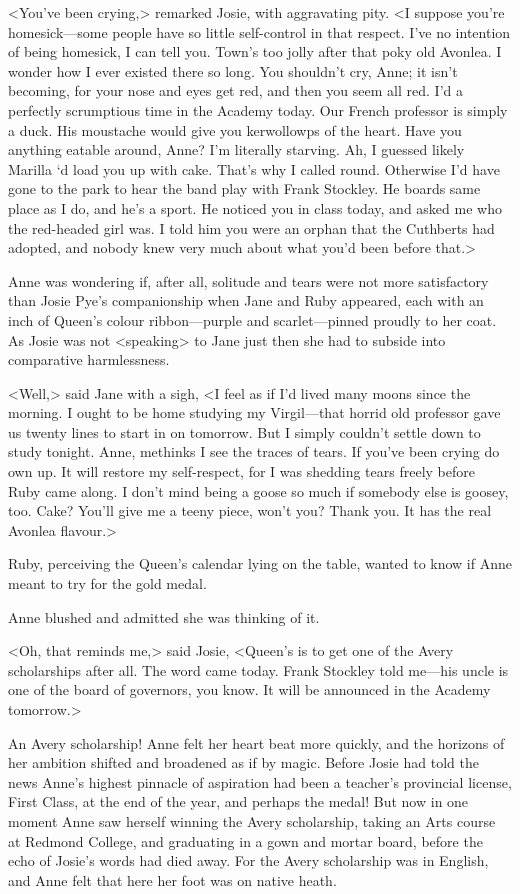 <You've been crying,> remarked Josie, with aggravating pity. <I suppose you're homesick—some people have so little self-control in that respect. I've no intention of being homesick, I can tell you. Town's too jolly after that poky old Avonlea. I wonder how I ever existed there so long. You shouldn't cry, Anne; it isn't becoming, for your nose and eyes get red, and then you seem all red. I'd a perfectly scrumptious time in the Academy today. Our French professor is simply a duck. His moustache would give you kerwollowps of the heart. Have you anything eatable around, Anne? I'm literally starving. Ah, I guessed likely Marilla `d load you up with cake. That's why I called round. Otherwise I'd have gone to the park to hear the band play with Frank Stockley. He boards same place as I do, and he's a sport. He noticed you in class today, and asked me who the red-headed girl was. I told him you were an orphan that the Cuthberts had adopted, and nobody knew very much about what you'd been before that.>

Anne was wondering if, after all, solitude and tears were not more satisfactory than Josie Pye's companionship when Jane and Ruby appeared, each with an inch of Queen's colour ribbon—purple and scarlet—pinned proudly to her coat. As Josie was not <speaking> to Jane just then she had to subside into comparative harmlessness.

<Well,> said Jane with a sigh, <I feel as if I'd lived many moons since the morning. I ought to be home studying my Virgil—that horrid old professor gave us twenty lines to start in on tomorrow. But I simply couldn't settle down to study tonight. Anne, methinks I see the traces of tears. If you've been crying do own up. It will restore my self-respect, for I was shedding tears freely before Ruby came along. I don't mind being a goose so much if somebody else is goosey, too. Cake? You'll give me a teeny piece, won't you? Thank you. It has the real Avonlea flavour.>

Ruby, perceiving the Queen's calendar lying on the table, wanted to know if Anne meant to try for the gold medal.

Anne blushed and admitted she was thinking of it.

<Oh, that reminds me,> said Josie, <Queen's is to get one of the Avery scholarships after all. The word came today. Frank Stockley told me—his uncle is one of the board of governors, you know. It will be announced in the Academy tomorrow.>

An Avery scholarship! Anne felt her heart beat more quickly, and the horizons of her ambition shifted and broadened as if by magic. Before Josie had told the news Anne's highest pinnacle of aspiration had been a teacher's provincial license, First Class, at the end of the year, and perhaps the medal! But now in one moment Anne saw herself winning the Avery scholarship, taking an Arts course at Redmond College, and graduating in a gown and mortar board, before the echo of Josie's words had died away. For the Avery scholarship was in English, and Anne felt that here her foot was on native heath.

